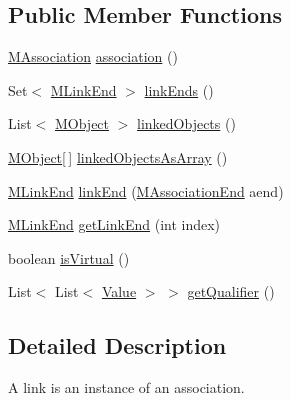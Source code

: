 \subsection*{Public Member Functions}
\begin{DoxyCompactItemize}
\item 
\hyperlink{interfaceorg_1_1tzi_1_1use_1_1uml_1_1mm_1_1_m_association}{M\-Association} \hyperlink{interfaceorg_1_1tzi_1_1use_1_1uml_1_1sys_1_1_m_link_a674c99501fee72a6f67574512faf99c6}{association} ()
\item 
Set$<$ \hyperlink{classorg_1_1tzi_1_1use_1_1uml_1_1sys_1_1_m_link_end}{M\-Link\-End} $>$ \hyperlink{interfaceorg_1_1tzi_1_1use_1_1uml_1_1sys_1_1_m_link_a924e58b6b95c8739f30369bfdfdb9f45}{link\-Ends} ()
\item 
List$<$ \hyperlink{interfaceorg_1_1tzi_1_1use_1_1uml_1_1sys_1_1_m_object}{M\-Object} $>$ \hyperlink{interfaceorg_1_1tzi_1_1use_1_1uml_1_1sys_1_1_m_link_a4329bdd28c8ad602adb22262aa1b2eb3}{linked\-Objects} ()
\item 
\hyperlink{interfaceorg_1_1tzi_1_1use_1_1uml_1_1sys_1_1_m_object}{M\-Object}\mbox{[}$\,$\mbox{]} \hyperlink{interfaceorg_1_1tzi_1_1use_1_1uml_1_1sys_1_1_m_link_ae9bd0263904b34ee17a7c1ef8d75818a}{linked\-Objects\-As\-Array} ()
\item 
\hyperlink{classorg_1_1tzi_1_1use_1_1uml_1_1sys_1_1_m_link_end}{M\-Link\-End} \hyperlink{interfaceorg_1_1tzi_1_1use_1_1uml_1_1sys_1_1_m_link_a48d413588af85f2ca80c4e702e499b5c}{link\-End} (\hyperlink{classorg_1_1tzi_1_1use_1_1uml_1_1mm_1_1_m_association_end}{M\-Association\-End} aend)
\item 
\hyperlink{classorg_1_1tzi_1_1use_1_1uml_1_1sys_1_1_m_link_end}{M\-Link\-End} \hyperlink{interfaceorg_1_1tzi_1_1use_1_1uml_1_1sys_1_1_m_link_a0d60cfd261ed2c7528296c32fb2a9a93}{get\-Link\-End} (int index)
\item 
boolean \hyperlink{interfaceorg_1_1tzi_1_1use_1_1uml_1_1sys_1_1_m_link_a960f6022c66e77b85898d69fa472c696}{is\-Virtual} ()
\item 
List$<$ List$<$ \hyperlink{classorg_1_1tzi_1_1use_1_1uml_1_1ocl_1_1value_1_1_value}{Value} $>$ $>$ \hyperlink{interfaceorg_1_1tzi_1_1use_1_1uml_1_1sys_1_1_m_link_af0ac11c0086b893abeac398a90cde9cb}{get\-Qualifier} ()
\end{DoxyCompactItemize}


\subsection{Detailed Description}
A link is an instance of an association.

